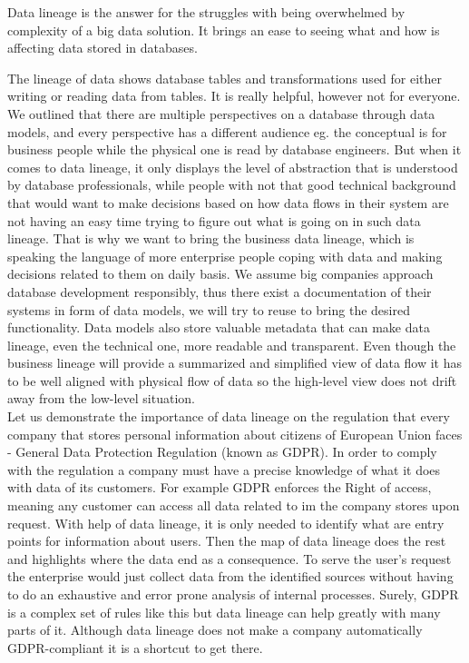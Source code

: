 Data lineage is the answer for the struggles with being overwhelmed by complexity of a big data solution. It brings an ease to seeing what and how is affecting data stored in databases.

The lineage of data shows database tables and transformations used for either writing or reading data from tables. It is really helpful, however not for everyone. 
We outlined that there are multiple perspectives on a database through data models, and every perspective has a different audience eg. the conceptual is for business people while the physical one is read by database engineers.
But when it comes to data lineage, it only displays the level of abstraction that is understood by database professionals, while people with not that good technical background that would want to make decisions based on how data flows in their system are not having an easy time trying to figure out what is going on in such data lineage.
That is why we want to bring the business data lineage, which is speaking the language of more enterprise people coping with data and making decisions related to them on daily basis. We assume big companies approach database development responsibly, thus there exist a documentation of their systems in form of data models, we will try to reuse to bring the desired functionality. Data models also store valuable metadata that can make data lineage, even the technical one, more readable and transparent. Even though the business lineage will provide a summarized and simplified view of data flow it has to be well aligned with physical flow of data so the high-level view does not drift away from the low-level situation.\\

Let us demonstrate the importance of data lineage on the regulation that every company that stores personal information about citizens of European Union faces - General Data Protection Regulation (known as GDPR).
In order to comply with the regulation a company must have a precise knowledge of what it does with data of its customers.  
For example GDPR enforces the Right of access\cite{RightOfAccess}, meaning any customer can access all data related to im the company stores upon request. With help of data lineage, it is only needed to identify what are entry points for information about users. Then the map of data lineage does the rest and highlights where the data end as a consequence. To serve the user's request the enterprise would just collect data from the identified sources without having to do an exhaustive and error prone analysis of internal processes.
Surely, GDPR is a complex set of rules like this but data lineage can help greatly with many parts of it. Although data lineage does not make a company automatically GDPR-compliant it is a shortcut to get there.

